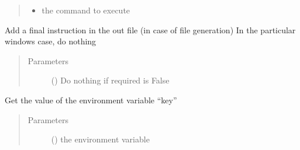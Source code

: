 \documentclass[a4paper,10pt,english]{sphinxmanual}
\begin{document}
\begin{fulllineitems}
\begin{fulllineitems}
\begin{quote}
\begin{description}
\begin{itemize}
\item {} 
 \textendash{} the command to execute

\end{itemize}

\end{description}\end{quote}

\end{fulllineitems}


\begin{fulllineitems}
\label{\detokenize{commands/apidoc/src:src.fileEnviron.BatFileEnviron.finish}}
Add a final instruction in the out file (in case of file generation)
In the particular windows case, do nothing
\begin{quote}\begin{description}
\item[{Parameters}] \leavevmode
{} () \textendash{} Do nothing if required is False

\end{description}\end{quote}

\end{fulllineitems}


\begin{fulllineitems}
\label{\detokenize{commands/apidoc/src:src.fileEnviron.BatFileEnviron.get}}
Get the value of the environment variable “key”
\begin{quote}\begin{description}
\item[{Parameters}] \leavevmode
{} () \textendash{} the environment variable

\end{description}\end{quote}

\end{fulllineitems}



\end{fulllineitems}
\end{document}
